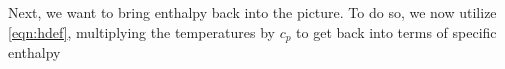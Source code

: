 


%
Next, we want to bring enthalpy back into the picture.
%
To do so, we now utilize \cref{eqn:hdef}, multiplying the temperatures by \(c_p\) to get back into terms of specific enthalpy




